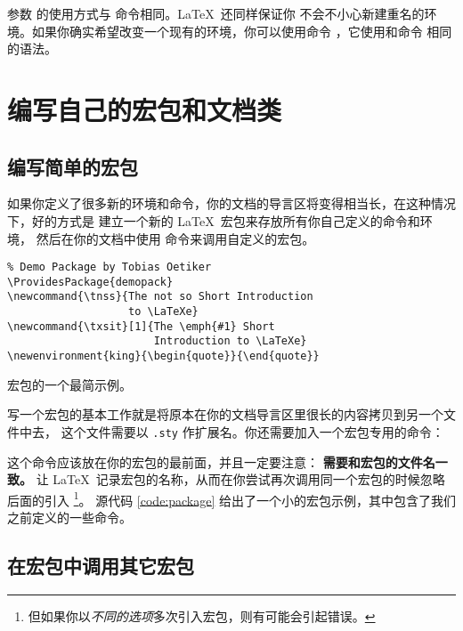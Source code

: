 参数  的使用方式与  命令相同。\LaTeX\ 还同样保证你
不会不小心新建重名的环境。如果你确实希望改变一个现有的环境，你可以使用命令
 ，它使用和命令  相同的语法。

\section{编写自己的宏包和文档类}

\subsection{编写简单的宏包}

如果你定义了很多新的环境和命令，你的文档的导言区将变得相当长，在这种情况下，好的方式是
建立一个新的 \LaTeX\ 宏包来存放所有你自己定义的命令和环境，
然后在你的文档中使用  命令来调用自定义的宏包。

\begin{sourcecode}[htbp]
\begin{Verbatim}
% Demo Package by Tobias Oetiker
\ProvidesPackage{demopack}
\newcommand{\tnss}{The not so Short Introduction
                   to \LaTeXe}
\newcommand{\txsit}[1]{The \emph{#1} Short
                       Introduction to \LaTeXe}
\newenvironment{king}{\begin{quote}}{\end{quote}}
\end{Verbatim}
\caption{宏包的一个最简示例。}\label{code:package}
\end{sourcecode}

写一个宏包的基本工作就是将原本在你的文档导言区里很长的内容拷贝到另一个文件中去，
 这个文件需要以 \texttt{.sty} 作扩展名。你还需要加入一个宏包专用的命令：
\begin{command}
\end{command}
这个命令应该放在你的宏包的最前面，并且一定要注意：\textbf{ 需要和宏包的文件名一致。}
 让 \LaTeX\ 记录宏包的名称，从而在你尝试再次调用同一个宏包的时候忽略后面的引入%
\footnote{但如果你以\emph{不同的选项}多次引入宏包，则有可能会引起错误。}。
源代码 \ref{code:package} 给出了一个小的宏包示例，其中包含了我们之前定义的一些命令。

\subsection{在宏包中调用其它宏包}

